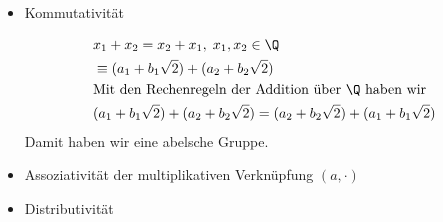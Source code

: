 \begin{itemize}
 \item Kommutativität

  \begin{align*}
    &x_1 + x_2 = x_2 + x_1, \; x_1, x_2 \in \Q \\
    &\equiv (a_1 + b_1 \sqrt{2}) + (a_2 + b_2 \sqrt{2})\\
    & \text{Mit den Rechenregeln der Addition über $\Q$ haben wir} \\
    & (a_1 + b_1 \sqrt{2}) + (a_2 + b_2 \sqrt{2}) = (a_2 + b_2 \sqrt{2}) + (a_1 + b_1 \sqrt{2}) \\
  \end{align*}
  Damit haben wir eine abelsche Gruppe.

  \item Assoziativität der multiplikativen Verknüpfung $(a, \cdot)$

  \item Distributivität

\end{itemize}